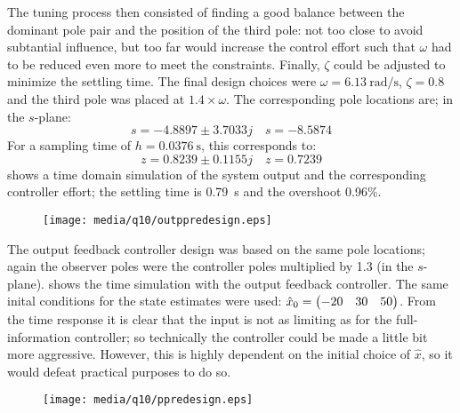 The tuning process then consisted of finding a good balance between the dominant pole pair and the position of the third pole: not too close to avoid subtantial influence, but too far would increase the control effort such that $\omega$ had to be reduced even more to meet the constraints. Finally, $\zeta$ could be adjusted to minimize the settling time. The final design choices were $\omega = \SI{6.13}{\radian\per\second}$, $\zeta = 0.8$ and the third pole was placed at $1.4\times\omega$. The corresponding pole locations are; in the $s$-plane:
$$ s = -4.8897 \pm 3.7033j  \quad s = -8.5874$$
For a sampling time of $h = \SI{0.0376}{\second}$, this corresponds to:
$$z = 0.8239 \pm 0.1155j \quad z = 0.7239$$
 shows a time domain simulation of the system output and the corresponding controller effort; the settling time is \SI{0.79}{\second} and the overshoot 0.96\%.
\begin{figure}[ht]
    \centering
    \texttt{[image: media/q10/outppredesign.eps]}
    \caption{}
    \label{fig:q10_ppredesign}
\end{figure}
The output feedback controller design was based on the same pole locations; again the observer poles were the controller poles multiplied by 1.3 (in the $s$-plane).  shows the time simulation with the output feedback controller. The same inital conditions for the state estimates were used: $\hat{x}_0 = \mqty(-20 & 30 & 50)$. From the time response it is clear that the input is not as limiting as for the full-information controller; so technically the controller could be made a little bit more aggressive. However, this is highly dependent on the initial choice of $\hat{x}$, so it would defeat practical purposes to do so.
\begin{figure}[ht]
    \centering
    \texttt{[image: media/q10/ppredesign.eps]}
    \caption{}
    \label{fig:q10_outppredesign}
\end{figure}
\FloatBarrier

